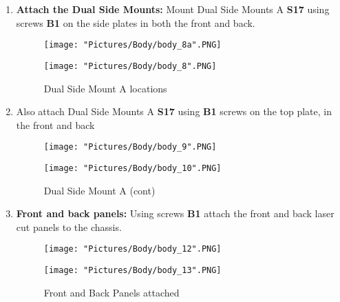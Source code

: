 \documentclass{article}
\begin{document}
\begin{enumerate}

\item \textbf{Attach the Dual Side Mounts:} Mount Dual Side Mounts A \textbf{S17} using screws \textbf{B1} on the side plates in both the front and back. 

\begin{figure}[H]
  \centering
  \begin{minipage}[b]{0.45\textwidth}
    \texttt{[image: "Pictures/Body/body\_8a".PNG]}
  \end{minipage}
  \hfill
  \begin{minipage}[b]{0.45\textwidth}
    \texttt{[image: "Pictures/Body/body\_8".PNG]}
  \end{minipage}
  \caption{Dual Side Mount A locations}
  \label{Dual Side Mounts}
\end{figure}

\item Also attach Dual Side Mounts A \textbf{S17} using \textbf{B1} screws on the top plate, in the front and back

\begin{figure}[H]
  \centering
  \begin{minipage}[b]{0.45\textwidth}
    \texttt{[image: "Pictures/Body/body\_9".PNG]}
  \end{minipage}
  \hfill
  \begin{minipage}[b]{0.45\textwidth}
    \texttt{[image: "Pictures/Body/body\_10".PNG]}
  \end{minipage}
  \caption{Dual Side Mount A (cont)}
  \label{Dual Side Mounts_cont}
\end{figure}


\item \textbf{Front and back panels:} Using screws \textbf{B1} attach the front and back laser cut panels to the chassis. 

\begin{figure}[H]
  \centering
  \begin{minipage}[b]{0.45\textwidth}
    \texttt{[image: "Pictures/Body/body\_12".PNG]}
  \end{minipage}
  \hfill
  \begin{minipage}[b]{0.45\textwidth}
    \texttt{[image: "Pictures/Body/body\_13".PNG]}
  \end{minipage}
  \caption{Front and Back Panels attached}
  \label{finished body}
\end{figure}



\end{enumerate}
\end{document}
